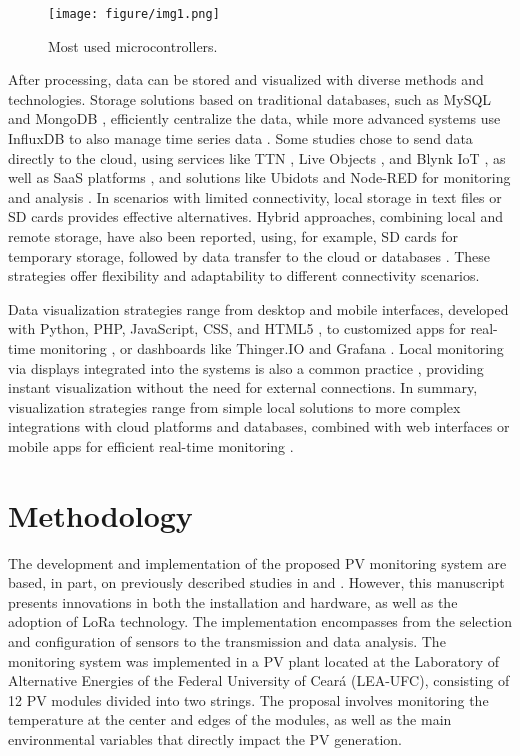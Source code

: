 \documentclass{ieeeaccess}
\begin{document}
\begin{figure}[t]
    \centering
    \texttt{[image: figure/img1.png]}
    \caption{Most used microcontrollers.}
    \label{fig:grafico1}
\end{figure}

After processing, data can be stored and visualized with diverse methods and technologies. Storage solutions based on traditional databases, such as MySQL \cite{1,7,22} and MongoDB \cite{5}, efficiently centralize the data, while more advanced systems use InfluxDB to also manage time series data \cite{9,28}. Some studies chose to send data directly to the cloud, using services like TTN \cite{3,17}, Live Objects \cite{8}, and Blynk IoT \cite{24}, as well as SaaS platforms \cite{8}, and solutions like Ubidots and Node-RED for monitoring and analysis \cite{9}. In scenarios with limited connectivity, local storage in text files \cite{3,13} or SD cards \cite{12,16} provides effective alternatives. Hybrid approaches, combining local and remote storage, have also been reported, using, for example, SD cards for temporary storage, followed by data transfer to the cloud or databases \cite{12,16,22}. These strategies offer flexibility and adaptability to different connectivity scenarios.

Data visualization strategies range from desktop and mobile interfaces, developed with Python, PHP, JavaScript, CSS, and HTML5 \cite{1,2,5,15}, to customized apps for real-time monitoring \cite{3,20,23,27}, or dashboards like Thinger.IO \cite{13} and Grafana \cite{9,28}. Local monitoring via displays integrated into the systems is also a common practice \cite{4,11,12,16,23,25,29}, providing instant visualization without the need for external connections. In summary, visualization strategies range from simple local solutions to more complex integrations with cloud platforms and databases, combined with web interfaces or mobile apps for efficient real-time monitoring \cite{1,3,5,7,9,17,24}.

\section{Methodology}
\label{sec:met}
The development and implementation of the proposed PV monitoring system are based, in part, on previously described studies in \cite{pereira2019iot2} and \cite{araripe2024monitoramento}. However, this manuscript presents innovations in both the installation and hardware, as well as the adoption of LoRa technology. The implementation encompasses from the selection and configuration of sensors to the transmission and data analysis. The monitoring system was implemented in a PV plant located at the Laboratory of Alternative Energies of the Federal University of Ceará (LEA-UFC), consisting of 12 PV modules divided into two strings. The proposal involves monitoring the temperature at the center and edges of the modules, as well as the main environmental variables that directly impact the PV generation.
\end{document}
